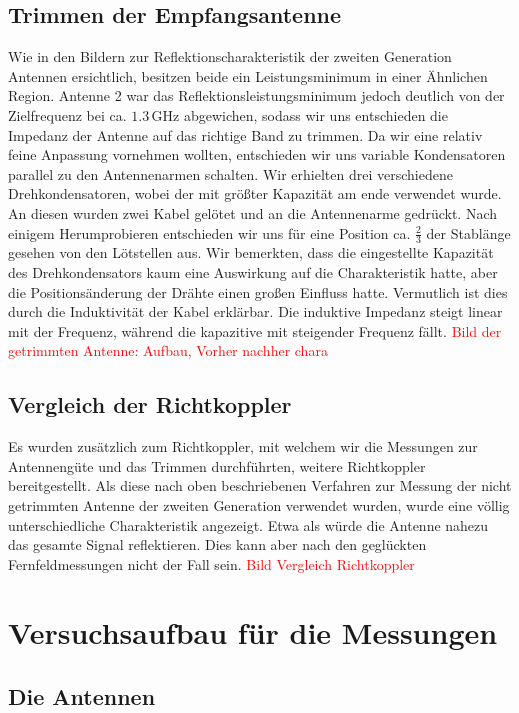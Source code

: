 \documentclass[titlepage,11pt,a4paper,ngerman]{article}
\begin{document}
\subsection{Trimmen der Empfangsantenne}
Wie in den Bildern zur Reflektionscharakteristik der zweiten Generation Antennen ersichtlich, besitzen beide ein Leistungsminimum in einer Ähnlichen Region. Antenne 2 war das Reflektionsleistungsminimum jedoch deutlich von der Zielfrequenz bei ca. $1.3\,$GHz abgewichen, sodass wir uns entschieden die Impedanz der Antenne auf das richtige Band zu trimmen. Da wir eine relativ feine Anpassung vornehmen wollten, entschieden wir uns variable Kondensatoren parallel zu den Antennenarmen schalten. Wir erhielten drei verschiedene Drehkondensatoren, wobei der mit größter Kapazität am ende verwendet wurde. An diesen wurden zwei Kabel gelötet und an die Antennenarme gedrückt. Nach einigem Herumprobieren entschieden wir uns für eine Position ca. $\frac{2}{3}$ der Stablänge gesehen von den Lötstellen aus. Wir bemerkten, dass die eingestellte Kapazität des Drehkondensators kaum eine Auswirkung auf die Charakteristik hatte, aber die Positionsänderung der Drähte einen großen Einfluss hatte. Vermutlich ist dies durch die Induktivität der Kabel erklärbar. Die induktive Impedanz steigt linear mit der Frequenz, während die kapazitive mit steigender Frequenz fällt. 
\textcolor{red}{Bild der getrimmten Antenne: Aufbau, Vorher nachher chara}

\subsection{Vergleich der Richtkoppler}
Es wurden zusätzlich zum Richtkoppler, mit welchem wir die Messungen zur Antennengüte und das Trimmen durchführten, weitere Richtkoppler bereitgestellt. Als diese nach oben beschriebenen Verfahren zur Messung der nicht getrimmten Antenne der zweiten Generation verwendet wurden, wurde eine völlig unterschiedliche Charakteristik angezeigt. Etwa als würde die Antenne nahezu das gesamte Signal reflektieren. Dies kann aber nach den geglückten Fernfeldmessungen nicht der Fall sein.
\textcolor{red}{Bild Vergleich Richtkoppler}

\section{Versuchsaufbau für die Messungen} 

\subsection{Die Antennen}
\end{document}
